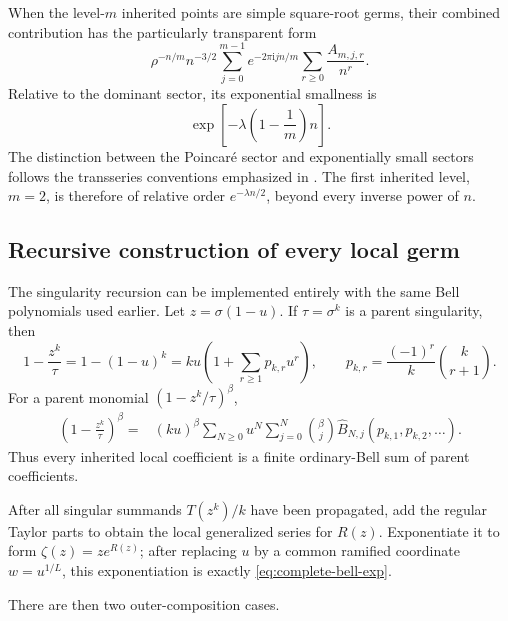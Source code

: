 \documentclass[11pt,oneside]{article}
\numberwithin{equation}{section}
\theoremstyle{plain}
\theoremstyle{definition}
\theoremstyle{remark}
\newcommand{\ii}{\mathrm i}
\newcommand{\Bhat}{\widehat{B}}
\begin{document}
When the level-$m$ inherited points are simple square-root germs, their
combined contribution has the particularly transparent form
\begin{equation}\label{eq:root-level-transseries}
 \rho^{-n/m}n^{-3/2}
 \sum_{j=0}^{m-1}e^{-2\pi\ii jn/m}
 \sum_{r\ge0}\frac{A_{m,j,r}}{n^r}.
\end{equation}
Relative to the dominant sector, its exponential smallness is
\begin{equation}\label{eq:relative-root-scale}
 \exp\!\left[-\lambda\left(1-\frac1m\right)n\right].
\end{equation}
The distinction between the Poincar\'e sector and exponentially small
sectors follows the transseries conventions emphasized in
\cite{ProveItTransseries}.  The first inherited level, $m=2$, is therefore of relative order
$e^{-\lambda n/2}$, beyond every inverse power of $n$.

\subsection{Recursive construction of every local germ}

The singularity recursion can be implemented entirely with the same Bell
polynomials used earlier.  Let $z=\sigma(1-u)$.  If $\tau=\sigma^k$ is a
parent singularity, then
\begin{equation}\label{eq:Pk-def}
 1-\frac{z^k}{\tau}=1-(1-u)^k
 =ku\left(1+\sum_{r\ge1}p_{k,r}u^r\right),
 \qquad
 p_{k,r}=\frac{(-1)^r}{k}\binom{k}{r+1}.
\end{equation}
For a parent monomial $(1-z^k/\tau)^\beta$,
\begin{align}
 \left(1-\frac{z^k}{\tau}\right)^\beta
 ={}&(ku)^\beta
 \sum_{N\ge0}u^N
 \sum_{j=0}^{N}\binom\beta j
 \Bhat_{N,j}(p_{k,1},p_{k,2},\ldots).
 \label{eq:parent-propagation}
\end{align}
Thus every inherited local coefficient is a finite ordinary-Bell sum of
parent coefficients.

After all singular summands $T(z^k)/k$ have been propagated, add the regular
Taylor parts to obtain the local generalized series for $R(z)$.  Exponentiate
it to form $\zeta(z)=z e^{R(z)}$; after replacing $u$ by a common ramified
coordinate $w=u^{1/L}$, this exponentiation is exactly
\eqref{eq:complete-bell-exp}.

There are then two outer-composition cases.
\end{document}
